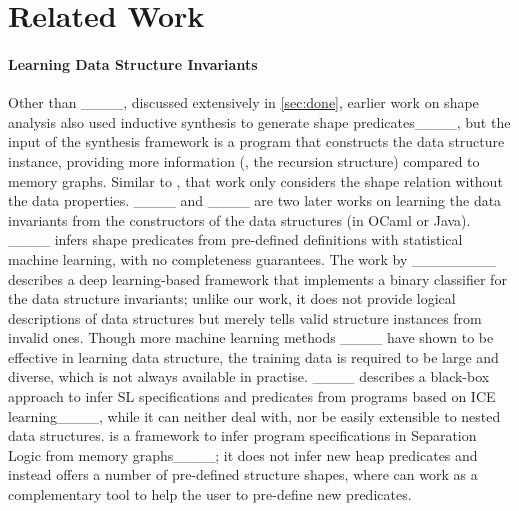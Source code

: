 \section{Related Work}
\label{sec:related}


\paragraph{Learning Data Structure Invariants} 
%
%
%
%


Other than \shape____,
discussed extensively in \autoref{sec:done}, earlier work on shape
analysis also used inductive synthesis to generate shape
predicates____, but the input of the synthesis
framework is a program that constructs the data structure instance,
providing more information (\eg, the recursion structure) compared to
memory graphs.
%
Similar to \shape, that work only considers the shape relation without
the data properties. ____ and
____ are two later works on
learning the data invariants from the constructors of the data
structures (in OCaml or Java).
____ infers shape predicates
from pre-defined definitions with statistical machine learning, with
no completeness guarantees. The work by
________ describes a deep learning-based
framework that implements a binary classifier for the data structure
invariants; unlike our work, it does not
provide logical descriptions of data structures but merely tells valid
structure instances from invalid ones. Though more machine learning
methods ____ have shown to be effective
in learning data structure, the training data is required to be large
and diverse, which is not always available in practise.
____ describes a black-box approach to
infer SL specifications and predicates from programs based on ICE
learning____, while it can neither deal with, nor be
easily extensible to nested data structures.  is a
framework to infer program specifications in Separation Logic from
memory graphs____; it does not infer new heap
predicates and instead offers a number of pre-defined structure
shapes, where \tool can work as a complementary tool to help the user
to pre-define new predicates.


